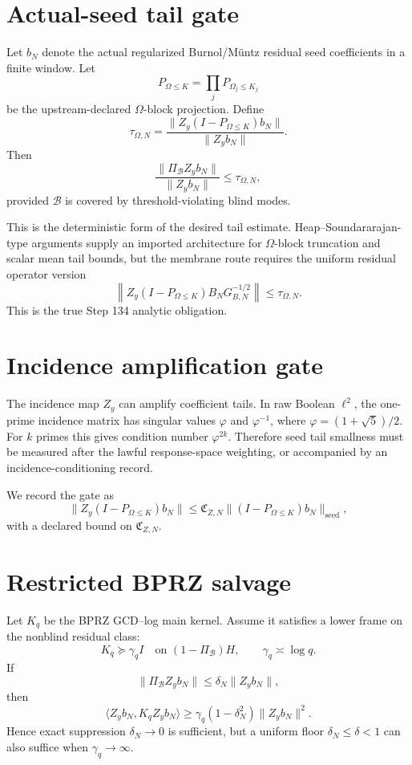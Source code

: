 \documentclass[11pt]{article}
\newcommand{\Om}{\Omega}
\begin{document}
\section{Actual-seed tail gate}
Let $b_N$ denote the actual regularized Burnol/M\"untz residual seed coefficients in a finite window.  Let
\[
  P_{\Om\le K}=\prod_j P_{\Om_j\le K_j}
\]
be the upstream-declared $\Omega$-block projection.  Define
\[
  \tau_{\Om,N}=\frac{\|Z_y(I-P_{\Om\le K})b_N\|}{\|Z_yb_N\|}.
\]
Then
\[
  \frac{\|\Pi_{\mathcal B}Z_yb_N\|}{\|Z_yb_N\|}\le \tau_{\Om,N},
\]
provided $\mathcal B$ is covered by threshold-violating blind modes.

This is the deterministic form of the desired tail estimate.  Heap--Soundararajan-type arguments supply an imported architecture for $\Omega$-block truncation and scalar mean tail bounds, but the membrane route requires the uniform residual operator version
\[
  \left\|Z_y(I-P_{\Om\le K})B_NG_{B,N}^{-1/2}\right\|\le \tau_{\Om,N}.
\]
This is the true Step 134 analytic obligation.

\section{Incidence amplification gate}
The incidence map $Z_y$ can amplify coefficient tails.  In raw Boolean $\ell^2$, the one-prime incidence matrix has singular values $\varphi$ and $\varphi^{-1}$, where $\varphi=(1+\sqrt5)/2$.  For $k$ primes this gives condition number $\varphi^{2k}$.  Therefore seed tail smallness must be measured after the lawful response-space weighting, or accompanied by an incidence-conditioning record.

We record the gate as
\[
  \|Z_y(I-P_{\Om\le K})b_N\|\le \mathfrak C_{Z,N}\|(I-P_{\Om\le K})b_N\|_{\mathrm{seed}},
\]
with a declared bound on $\mathfrak C_{Z,N}$.

\section{Restricted BPRZ salvage}
Let $K_q$ be the BPRZ GCD--log main kernel.  Assume it satisfies a lower frame on the nonblind residual class:
\[
  K_q\succeq \gamma_q I\quad\text{on }(1-\Pi_{\mathcal B})H,
  \qquad \gamma_q\asymp \log q.
\]
If
\[
  \|\Pi_{\mathcal B}Z_yb_N\|\le \delta_N\|Z_yb_N\|,
\]
then
\[
  \langle Z_yb_N,K_qZ_yb_N\rangle
  \ge \gamma_q(1-\delta_N^2)\|Z_yb_N\|^2.
\]
Hence exact suppression $\delta_N\to0$ is sufficient, but a uniform floor $\delta_N\le\delta<1$ can also suffice when $\gamma_q\to\infty$.
\end{document}
